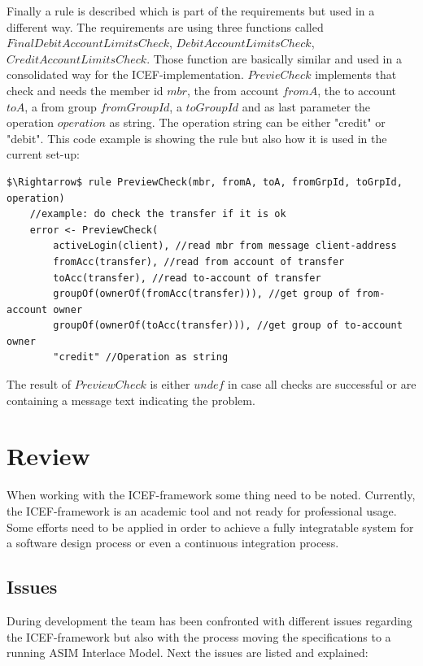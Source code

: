 Finally a rule is described which is part of the requirements but used in a different way. The requirements are using three functions called $FinalDebitAccountLimitsCheck$, $DebitAccountLimitsCheck$, $CreditAccountLimitsCheck$. Those function are basically similar and used in a consolidated way for the ICEF-implementation. $PrevieCheck$ implements that check and needs the member id $mbr$, the from account $fromA$, the to account $toA$, a from group $fromGroupId$, a $toGroupId$ and as last parameter the operation $operation$ as string. The operation string can be either "credit" or "debit". This code example is showing the rule but also how it is used in the current set-up:

\begin{lstlisting}[language=bsl,mathescape=true]
	$\Rightarrow$ rule PreviewCheck(mbr, fromA, toA, fromGrpId, toGrpId, operation)
	//example: do check the transfer if it is ok
	error <- PreviewCheck(
		activeLogin(client), //read mbr from message client-address
		fromAcc(transfer), //read from account of transfer
		toAcc(transfer), //read to-account of transfer
		groupOf(ownerOf(fromAcc(transfer))), //get group of from-account owner
		groupOf(ownerOf(toAcc(transfer))), //get group of to-account owner
		"credit" //Operation as string
\end{lstlisting}

The result of $PreviewCheck$ is either $undef$ in case all checks are successful or are containing a message text indicating the problem.

\section{Review}
\label{sec:impl-issues}

When working with the ICEF-framework some thing need to be noted. Currently, the ICEF-framework is an academic tool and not ready for professional usage. Some efforts need to be applied in order to achieve a fully integratable system for a software design process or even a continuous integration process.

\subsection{Issues}

During development the team has been confronted with different issues regarding the ICEF-framework but also with the process moving the specifications to a running ASIM Interlace Model. Next the issues are listed and explained:

